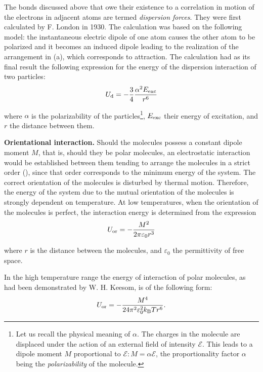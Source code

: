 The bonds discussed above that owe their existence to a correlation in motion of the electrons in adjacent atoms are termed \textit{dispersion forces}. They were first calculated by F. London in 1930. The calculation was based on the following model: the instantaneous electric dipole of one atom causes the other atom to be polarized and it becomes an induced dipole leading to the realization of the arrangement in (a), which corresponds to attraction. The calculation had as its final result the following expression for the energy of the dispersion interaction of two particles:
\begin{equation}\label{eq:1_2}
	U_{\text{d}} = - \frac{3}{4}\frac{\alpha^2 E_{\text{exc}}}{r^6}
\end{equation}

\noindent
where $\alpha$ is the polarizability of the particles\footnote{Let us recall the physical meaning of $\alpha$. The charges in the molecule are displaced under the action of an external field of intensity $\mathscr{E}$. This leads to a dipole moment $M$ proportional to $\mathscr{E}: M = \alpha\mathscr{E}$, the proportionality factor $\alpha$ being the \textit{polarizability} of the molecule.}, $E_{\text{exc}}$ their energy of excitation, and $r$ the distance between them.

\textbf{Orientational interaction.} Should the molecules possess a constant dipole moment $M$, that is, should they be polar molecules, an electrostatic interaction would be established between them tending to arrange the molecules in a strict order (), since that order corresponds to the minimum energy of the system. The correct orientation of the molecules is disturbed by thermal motion. Therefore, the energy of the system due to the mutual orientation of the molecules is strongly dependent on temperature. At low temperatures, when the orientation of the molecules is perfect, the interaction energy is determined from the expression
\vspace{-12pt}
\begin{equation}\label{eq:1_3}
	U_{\text{or}} = - \frac{M^2}{2\pi\varepsilon_0 r^3}
\end{equation}

\noindent
where $r$ is the distance between the molecules, and $\varepsilon_0$ the permittivity of free space.

In the high temperature range the energy of interaction of polar molecules, as had been demonstrated by W. H. Keesom, is of the following form:
\begin{equation}\label{eq:1_4}
	U_{\text{or}} = - \frac{M^4}{24\pi^2\varepsilon_0^2 k_{\text{B}} T r^6}.
\end{equation}

